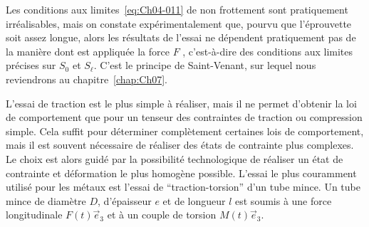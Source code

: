 Les conditions aux limites~\eqref{eq:Ch04-011} de non frottement sont pratiquement irréalisables, mais on constate expérimentalement que, pourvu que l'éprouvette soit assez longue, alors les résultats de l'essai ne dépendent pratiquement pas de la manière dont est appliquée la force $F$ , c'est-à-dire des conditions aux limites précises sur $S_0$ et $S_\ell$.
C'est le principe de Saint-Venant, sur lequel nous reviendrons au chapitre~\ref{chap:Ch07}.

L'essai de traction est le plus simple à réaliser, mais il ne permet d'obtenir la loi de comportement que pour un tenseur des contraintes de traction ou compression simple.
Cela suffit pour déterminer complètement certaines lois de comportement, mais il est souvent nécessaire de réaliser des états de contrainte plus complexes.
Le choix est alors guidé par la possibilité technologique de réaliser un état de contrainte et déformation le plus homogène possible.
L'essai le plus couramment utilisé pour les métaux est l'essai de ``traction-torsion'' d'un tube mince.
Un tube mince de diamètre $D$, d'épaisseur $e$ et de longueur $l$ est soumis à une force longitudinale $F(t) \vec{e}_3$ et à un couple de torsion $M(t) \vec{e}_3$.

